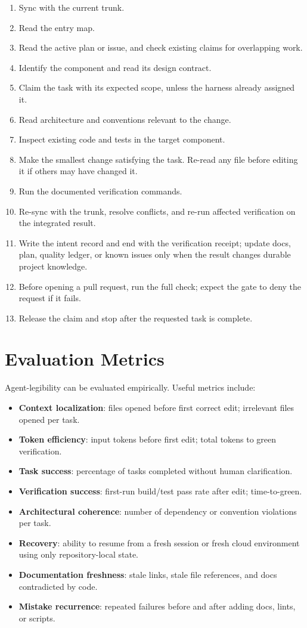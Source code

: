 \documentclass[11pt]{article}
\begin{document}
\begin{enumerate}[leftmargin=*]
  \item Sync with the current trunk.
  \item Read the entry map.
  \item Read the active plan or issue, and check existing claims for overlapping work.
  \item Identify the component and read its design contract.
  \item Claim the task with its expected scope, unless the harness already assigned it.
  \item Read architecture and conventions relevant to the change.
  \item Inspect existing code and tests in the target component.
  \item Make the smallest change satisfying the task. Re-read any file before editing it if others may have changed it.
  \item Run the documented verification commands.
  \item Re-sync with the trunk, resolve conflicts, and re-run affected verification on the integrated result.
  \item Write the intent record and end with the verification receipt; update docs, plan, quality ledger, or known issues only when the result changes durable project knowledge.
  \item Before opening a pull request, run the full check; expect the gate to deny the request if it fails.
  \item Release the claim and stop after the requested task is complete.
\end{enumerate}

\section{Evaluation Metrics}
Agent-legibility can be evaluated empirically. Useful metrics include:

\begin{itemize}[leftmargin=*]
  \item \textbf{Context localization}: files opened before first correct edit; irrelevant files opened per task.
  \item \textbf{Token efficiency}: input tokens before first edit; total tokens to green verification.
  \item \textbf{Task success}: percentage of tasks completed without human clarification.
  \item \textbf{Verification success}: first-run build/test pass rate after edit; time-to-green.
  \item \textbf{Architectural coherence}: number of dependency or convention violations per task.
  \item \textbf{Recovery}: ability to resume from a fresh session or fresh cloud environment using only repository-local state.
  \item \textbf{Documentation freshness}: stale links, stale file references, and docs contradicted by code.
  \item \textbf{Mistake recurrence}: repeated failures before and after adding docs, lints, or scripts.
\end{itemize}
\end{document}
